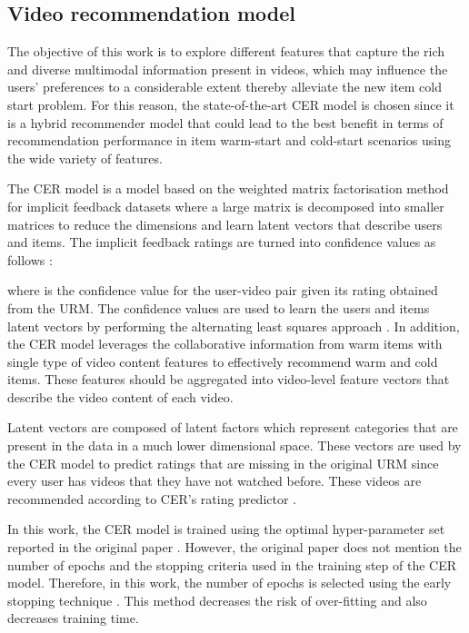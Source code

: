 \documentclass[review]{elsarticle}
\begin{document}
\subsection{Video recommendation model}
The objective of this work is to explore different features that capture the rich and diverse multimodal information present in videos, which may influence the users’ preferences to a considerable extent \citep{deldjoo2020recommender} thereby alleviate the new item cold start problem. For this reason, the state-of-the-art \ac{CER} model \citep{du2018personalized} is chosen since it is a hybrid recommender model that could lead to the best benefit in terms of recommendation performance in item warm-start and cold-start scenarios using the wide variety of features. 

The \ac{CER} model is a model based on the weighted matrix factorisation method for implicit feedback datasets where a large matrix is decomposed into smaller matrices to reduce the dimensions and learn latent vectors that describe users and items. The implicit feedback ratings are turned into confidence values as follows \citep{du2018personalized}:




\noindent where  is the confidence value for the user-video pair  given its rating  obtained from the \ac{URM}. The confidence values are used to learn the users and items latent vectors by performing the alternating least squares approach \citep{du2018personalized}. In addition, the CER model leverages the collaborative information from warm items with single type of video content features to effectively recommend warm and cold items. These features should be aggregated into video-level feature vectors that describe the video content of each video. 

Latent vectors are composed of latent factors which represent categories that are present in the data in a much lower dimensional space. These vectors are used by the \ac{CER} model to predict ratings that are missing in the original \ac{URM} since every user has videos that they have not watched before. These videos are recommended according to CER's rating predictor \citep{du2018personalized}. 

In this work, the CER model is trained using the optimal hyper-parameter set reported in the original paper \citep{du2018personalized}. However, the original paper does not mention the number of epochs and the stopping criteria used in the training step of the CER model. Therefore, in this work, the number of epochs is selected using the early stopping technique \citep{dacrema2019troubling}. This method decreases the risk of over-fitting and also decreases training time.
\end{document}
